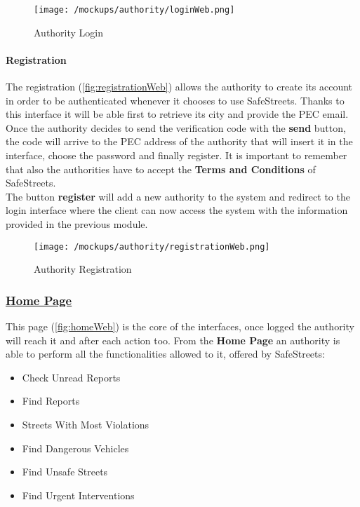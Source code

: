 				\vspace{0.6cm}
				
				\begin{figure}[ht!]
					\centering
					\texttt{[image: /mockups/authority/loginWeb.png]}
					\caption{\label{fig:loginWeb} Authority Login}
				\end{figure}
			
				\paragraph{Registration}
				The registration (\autoref{fig:registrationWeb}) allows the authority to create its account in order to be authenticated whenever it chooses to use SafeStreets. Thanks to this interface it will be able first to retrieve its city and provide the PEC email. Once the authority decides to send the verification code with the \textbf{send} button, the code will arrive to the PEC address of the authority that will insert it in the interface, choose the password and finally register. It is important to remember that also the authorities have to accept the \textbf{Terms and Conditions} of SafeStreets.\\
				
				The button \textbf{register} will add a new authority to the system and redirect to the login interface where the client can now access the system with the information provided in the previous module.
				
				\newpage
				
				\begin{figure}[ht!]
					\centering
					\texttt{[image: /mockups/authority/registrationWeb.png]}
					\caption{\label{fig:registrationWeb} Authority Registration}
				\end{figure}
			
			\subsubsection[Home Page]{\hyperlink{toc}{Home Page}}
				\label{sec:authorityHomePage}
				
				This page (\autoref{fig:homeWeb}) is the core of the interfaces, once logged the authority will reach it and after each action too. From the \textbf{Home Page} an authority is able to perform all the functionalities allowed to it, offered by SafeStreets:
				
				\begin{itemize}
					\item Check Unread Reports
					\item Find Reports
					\item Streets With Most Violations
					\item Find Dangerous Vehicles
					\item Find Unsafe Streets
					\item Find Urgent Interventions
				\end{itemize}
			
